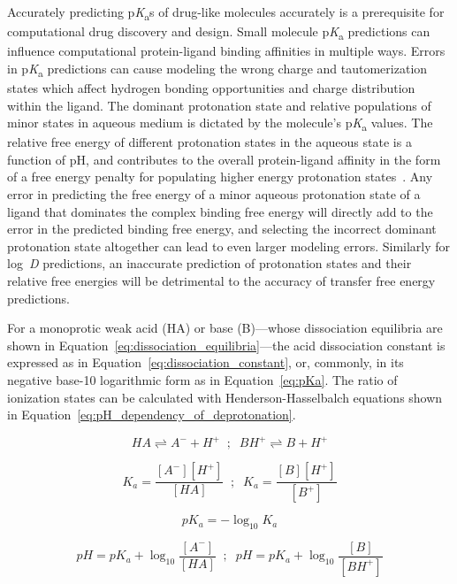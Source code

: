 \documentclass[9pt,lineno,final]{elife}
\newcommand{\pKa}{p\textit{K}\textsubscript{a}}
\newcommand{\logD}{log~\textit{D}}
\begin{document}
Accurately predicting \pKa{}s of drug-like molecules accurately is a prerequisite for computational drug discovery and design.
Small molecule \pKa{} predictions can influence computational protein-ligand binding affinities in multiple ways. 
Errors in \pKa{} predictions can cause modeling the wrong charge and tautomerization states which affect hydrogen bonding opportunities and charge distribution within  the ligand.
The dominant protonation state and relative populations of minor states in aqueous medium is dictated by the molecule's \pKa{} values. 
The relative free energy of different protonation states in the aqueous state is a function of pH, and contributes to the overall protein-ligand affinity in the form of a free energy penalty for populating higher energy protonation states~\citep{deOliveira:2019:J.Chem.TheoryComput.}.
Any error in predicting the free energy of a minor aqueous protonation state of a ligand that dominates the complex binding free energy will directly add to the error in the predicted binding free energy, and selecting the incorrect dominant protonation state altogether can lead to even larger modeling errors. 
Similarly for \logD{} predictions, an inaccurate prediction of protonation states and their relative free energies will be detrimental to the accuracy of transfer free energy predictions.

For a monoprotic weak acid (HA) or base (B)---whose dissociation equilibria are shown in Equation~\ref{eq:dissociation_equilibria}---the acid dissociation constant is expressed as in Equation~\ref{eq:dissociation_constant}, or, commonly, in its negative base-10 logarithmic form as in Equation~\ref{eq:pKa}. 
The ratio of ionization states can be calculated with Henderson-Hasselbalch equations shown in Equation~\ref{eq:pH_dependency_of_deprotonation}. 

\begin{equation}
HA \rightleftharpoons A^- + H^+ \;\; ; \;\; BH^+ \rightleftharpoons B + H^+
\label{eq:dissociation_equilibria}
\end{equation}

\begin{equation}
K_a = \frac{[A^-][H^+]}{[HA]}\;\; ; \;\;K_a = \frac{[B][H^+]}{[B^+]} 
\label{eq:dissociation_constant}
\end{equation}

\begin{equation}
pK_a = -\log_{10}{K_a}
\label{eq:pKa}
\end{equation}


\begin{equation}
pH = pK_a + \log_{10}{\frac{[A^-]}{[HA]}}\;\; ; \;\;pH = pK_a + \log_{10}{\frac{[B]}{[BH^+]}}
\label{eq:pH_dependency_of_deprotonation}
\end{equation}
\end{document}
